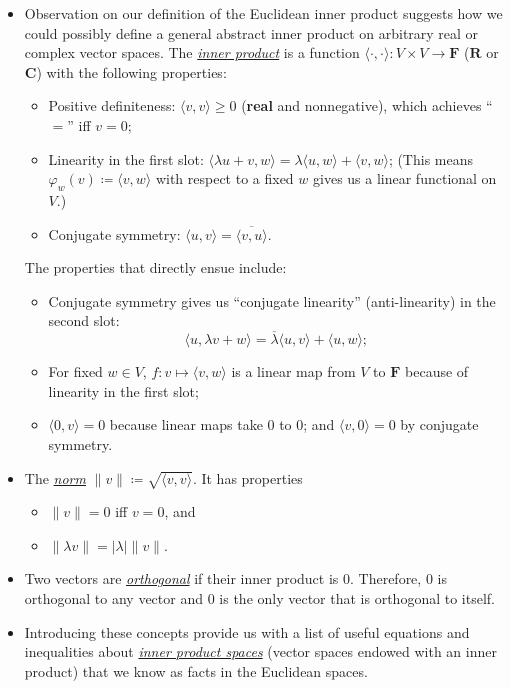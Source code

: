\documentclass[11pt]{article}
\newcommand{\df}[1]{\ul{\textit{\textsf{#1}}}}
\newcommand{\R}{\mathbf{R}}
\newcommand{\C}{\mathbf{C}}
\newcommand{\F}{\mathbf{F}}
\newcommand{\conj}[1]{\overline{#1}}
\newcommand{\inp}[2]{\langle #1, #2 \rangle}
\renewcommand{\phi}{\varphi}
\begin{document}
\begin{itemize}
    \item Observation on our definition of the Euclidean inner product suggests how we could possibly define a general abstract inner product on arbitrary real or complex vector spaces. The \df{inner product} is a function $\inp{\cdot}{\cdot}: V \times V \to \F$ ($\R$ or $\C$) with the following properties:
    \begin{itemize}
        \item Positive definiteness: $\inp{v}{v} \geq 0$ (\textbf{real} and nonnegative), which achieves ``$=$'' iff $v = 0$;
        \item Linearity in the first slot: $\inp{\lambda u+v}{w} = \lambda \inp{u}{w} + \inp{v}{w}$; (This means $\phi_w(v) \coloneqq \inp{v}{w}$ with respect to a fixed $w$ gives us a linear functional on $V$.)
        \item Conjugate symmetry: $\inp{u}{v} = \conj{\inp{v}{u}}$.
    \end{itemize}
    The properties that directly ensue include:
    \begin{itemize}
        \item Conjugate symmetry gives us ``conjugate linearity'' (anti-linearity) in the second slot: $$\inp{u}{\lambda v+w} = \conj{\lambda} \inp{u}{v} + \inp{u}{w};$$
        \item For fixed $w \in V$, $f: v \mapsto \inp{v}{w}$ is a linear map from $V$ to $\F$ because of linearity in the first slot;
        \item $\inp{0}{v} = 0$ because linear maps take 0 to 0; and $\inp{v}{0} = 0$ by conjugate symmetry.
    \end{itemize}
    \item The \df{norm} $\|v\| \coloneqq \sqrt{\inp{v}{v}}.$ It has properties
    \begin{itemize}
        \item $\|v\| = 0$ iff $v = 0$, and 
        \item $\|\lambda v\| = |\lambda| \|v\|$.
    \end{itemize}
    \item Two vectors are \df{orthogonal} if their inner product is 0. Therefore, 0 is orthogonal to any vector and 0 is the only vector that is orthogonal to itself.
    \item Introducing these concepts provide us with a list of useful equations and inequalities about \df{inner product spaces} (vector spaces endowed with an inner product) that we know as facts in the Euclidean spaces.
    \begin{itemize}

\end{itemize}
\end{itemize}
\end{document}
